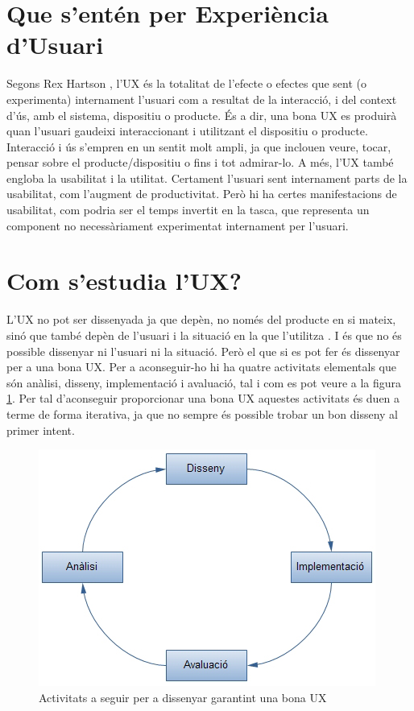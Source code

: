 

\section{Que s'entén per Experiència d'Usuari}
Segons Rex Hartson \cite{def_UX}, l'\ac{UX} és la totalitat de l'efecte o efectes que sent (o experimenta) internament l'usuari com a resultat de la interacció, i del context d'ús, amb el sistema, dispositiu o producte. És a dir, una bona \ac{UX} es produirà quan l'usuari gaudeixi interaccionant i utilitzant el dispositiu o producte. Interacció i ús s'empren en un sentit molt ampli, ja que inclouen veure, tocar, pensar sobre el producte/dispositiu o fins i tot admirar-lo. 
A més, l'\ac{UX} també engloba la usabilitat i la utilitat. Certament l'usuari sent internament parts de la usabilitat, com l'augment de productivitat. Però hi ha certes manifestacions de usabilitat, com podria ser el temps invertit en la tasca, que representa un component no necessàriament experimentat internament per l'usuari.

\section{Com s'estudia l'\ac{UX}?}
L'\ac{UX} no pot ser dissenyada ja que depèn, no només del producte en si mateix, sinó que també depèn de l'usuari i la situació en la que l'utilitza \cite{cant_design_UX}. I és que no és possible dissenyar ni l'usuari ni la situació. Però el que si es pot fer és dissenyar per a una bona \ac{UX}. Per a aconseguir-ho hi ha quatre activitats elementals que són anàlisi, disseny, implementació i avaluació, tal i com es pot veure a la figura \ref{fig:UX_lifecycle}. Per tal d'aconseguir proporcionar una bona \ac{UX} aquestes activitats és duen a terme de forma iterativa, ja que no sempre és possible trobar un bon disseny al primer intent.

\begin{figure}[htp]
\centering
\includegraphics[scale=0.6]{UX_wheel.jpg}
\caption{Activitats a seguir per a dissenyar garantint una bona \ac{UX}}\label{fig:UX_lifecycle}
\end{figure}

